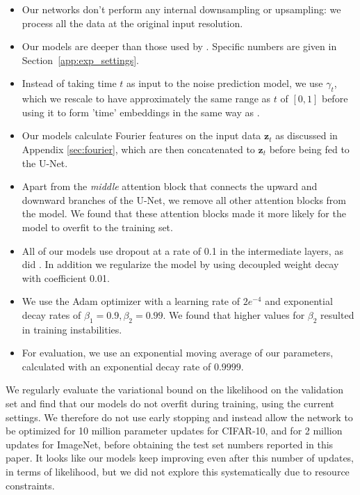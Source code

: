 \documentclass{article}
\def\rvz{{\mathbf{z}}}
\begin{document}
\begin{itemize}
    \item Our networks don't perform any internal downsampling or upsampling: we process all the data at the original input resolution.
    \item Our models are deeper than those used by \cite{ho2020denoising}. Specific numbers are given in Section~\ref{app:exp_settings}.
    \item Instead of taking time $t$ as input to the noise prediction model, we use $\gamma_t$, which we rescale to have approximately the same range as $t$ of $[0,1]$ before using it to form 'time' embeddings in the same way as \cite{ho2020denoising}. 
    \item Our models calculate Fourier features on the input data $\rvz_t$ as discussed in Appendix \ref{sec:fourier}, which are then concatenated to $\rvz_t$ before being fed to the U-Net.
    \item Apart from the \emph{middle} attention block that connects the upward and downward branches of the U-Net, we remove all other attention blocks from the model. We found that these attention blocks made it more likely for the model to overfit to the training set.
    \item All of our models use dropout at a rate of 0.1 in the intermediate layers, as did \cite{ho2020denoising}. In addition we regularize the model by using decoupled weight decay \citep{loshchilov2017decoupled} with coefficient 0.01.
    \item We use the Adam optimizer with a learning rate of $2e^{-4}$ and exponential decay rates of $\beta_{1}=0.9, \beta_{2}=0.99$. We found that higher values for $\beta_{2}$ resulted in training instabilities.
    \item For evaluation, we use an exponential moving average of our parameters, calculated with an exponential decay rate of $0.9999$.
\end{itemize}



We regularly evaluate the variational bound on the likelihood on the validation set and find that our models do not overfit during training, using the current settings. We therefore do not use early stopping and instead allow the network to be optimized for 10 million parameter updates for CIFAR-10, and for 2 million updates for ImageNet, before obtaining the test set numbers reported in this paper. It looks like our models keep improving even after this number of updates, in terms of likelihood, but we did not explore this systematically due to resource constraints.
\end{document}
